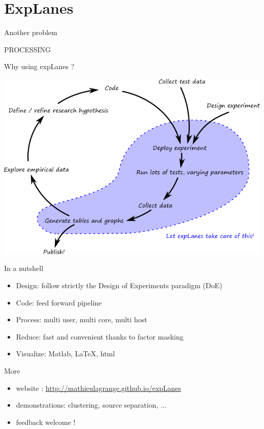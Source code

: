 \documentclass[compress]{beamer}
\begin{document}
\section{ExpLanes}

\begin{frame}{Another problem}
\begin{center}
\huge PROCESSING
\end{center}
\end{frame}

\begin{frame}{Why using expLanes ?}
\begin{center}
\includegraphics[width=.9\columnwidth]{figures/workflow} \\
\end{center}
\end{frame}

\begin{frame}{In a nutshell}
\begin{itemize}
\item Design: follow strictly the Design of Experiments paradigm (DoE)
\item Code: feed forward pipeline
\item Process: multi user, multi core, multi host
\item Reduce: fast and convenient thanks to factor masking
\item Visualize: Matlab, \LaTeX, html
\end{itemize}
\end{frame}

\begin{frame}{More}
\begin{itemize}
\item website : \url{http://mathieulagrange.github.io/expLanes}
\item demonstrations: clustering, source separation, ...
\item feedback welcome !
\end{itemize}
\end{frame}
\end{document}
